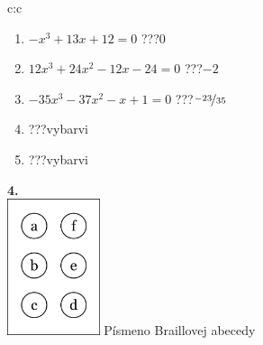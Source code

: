 \documentclass[10pt]{report}
\begin{document}
\begin{tabular}{c:c}
\begin{minipage}[c][104.5mm][t]{0.5\linewidth}
\begin{center}
\begin{minipage}{0.79\linewidth}
\begin{center}
\begin{varwidth}{\linewidth}
\begin{enumerate}
\item $-x^3+13x+12=0$\quad \dotfill\; ???\;\dotfill \quad $0$
\item $12x^3+24x^2-12x-24=0$\quad \dotfill\; ???\;\dotfill \quad $-2$
\item $-35x^3-37x^2-x+1=0$\quad \dotfill\; ???\;\dotfill \quad $\nicefrac{-23}{35}$
\item \quad \dotfill\; ???\;\dotfill \quad vybarvi
\item \quad \dotfill\; ???\;\dotfill \quad vybarvi
\end{enumerate}
\end{varwidth}
\end{center}
\end{minipage}
\begin{minipage}{0.20\linewidth}
\begin{center}
{\Huge\bfseries 4.} \\[2mm]
\includegraphics[height=40mm]{../images/braille.png}
{\small Písmeno Braillovej abecedy}
\end{center}
\end{minipage}
\end{center}
\end{minipage}
%
\end{tabular}
\newpage
\thispagestyle{empty}
\end{document}
